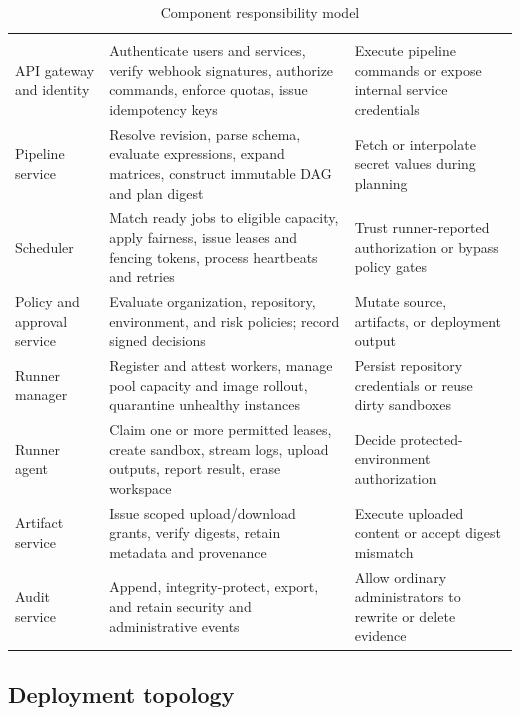 \begin{longtable}{@{}L{0.25\textwidth}L{0.35\textwidth}L{0.33\textwidth}@{}}
\caption{Component responsibility model}\label{tab:components}\\
\toprule
{} &  &  \\
\midrule
\endfirsthead
\toprule
{} &  &  \\
\midrule
\endhead
API gateway and identity & Authenticate users and services, verify webhook signatures, authorize commands, enforce quotas, issue idempotency keys & Execute pipeline commands or expose internal service credentials \\
Pipeline service & Resolve revision, parse schema, evaluate expressions, expand matrices, construct immutable DAG and plan digest & Fetch or interpolate secret values during planning \\
Scheduler & Match ready jobs to eligible capacity, apply fairness, issue leases and fencing tokens, process heartbeats and retries & Trust runner-reported authorization or bypass policy gates \\
Policy and approval service & Evaluate organization, repository, environment, and risk policies; record signed decisions & Mutate source, artifacts, or deployment output \\
Runner manager & Register and attest workers, manage pool capacity and image rollout, quarantine unhealthy instances & Persist repository credentials or reuse dirty sandboxes \\
Runner agent & Claim one or more permitted leases, create sandbox, stream logs, upload outputs, report result, erase workspace & Decide protected-environment authorization \\
Artifact service & Issue scoped upload/download grants, verify digests, retain metadata and provenance & Execute uploaded content or accept digest mismatch \\
Audit service & Append, integrity-protect, export, and retain security and administrative events & Allow ordinary administrators to rewrite or delete evidence \\
\bottomrule
\end{longtable}

\subsection{Deployment topology}

